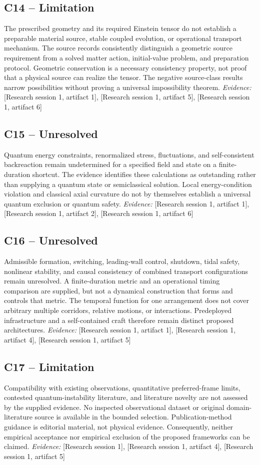 \documentclass[11pt]{article}
\begin{document}
\begin{sloppypar}
\subsection{C14 -- Limitation}
The prescribed geometry and its required Einstein tensor do not establish a preparable material source, stable coupled evolution, or operational transport mechanism.
The source records consistently distinguish a geometric source requirement from a solved matter action, initial-value problem, and preparation protocol. Geometric conservation is a necessary consistency property, not proof that a physical source can realize the tensor. The negative source-class results narrow possibilities without proving a universal impossibility theorem.
\textit{Evidence: }[Research session 1, artifact 1], [Research session 1, artifact 5], [Research session 1, artifact 6]
\subsection{C15 -- Unresolved}
Quantum energy constraints, renormalized stress, fluctuations, and self-consistent backreaction remain undetermined for a specified field and state on a finite-duration shortcut.
The evidence identifies these calculations as outstanding rather than supplying a quantum state or semiclassical solution. Local energy-condition violation and classical axial curvature do not by themselves establish a universal quantum exclusion or quantum safety.
\textit{Evidence: }[Research session 1, artifact 1], [Research session 1, artifact 2], [Research session 1, artifact 6]
\subsection{C16 -- Unresolved}
Admissible formation, switching, leading-wall control, shutdown, tidal safety, nonlinear stability, and causal consistency of combined transport configurations remain unresolved.
A finite-duration metric and an operational timing comparison are supplied, but not a dynamical construction that forms and controls that metric. The temporal function for one arrangement does not cover arbitrary multiple corridors, relative motions, or interactions. Predeployed infrastructure and a self-contained craft therefore remain distinct proposed architectures.
\textit{Evidence: }[Research session 1, artifact 1], [Research session 1, artifact 4], [Research session 1, artifact 5]
\subsection{C17 -- Limitation}
Compatibility with existing observations, quantitative preferred-frame limits, contested quantum-instability literature, and literature novelty are not assessed by the supplied evidence.
No inspected observational dataset or original domain-literature source is available in the bounded selection. Publication-method guidance is editorial material, not physical evidence. Consequently, neither empirical acceptance nor empirical exclusion of the proposed frameworks can be claimed.
\textit{Evidence: }[Research session 1], [Research session 1, artifact 4], [Research session 1, artifact 5]

\end{sloppypar}
\end{document}
